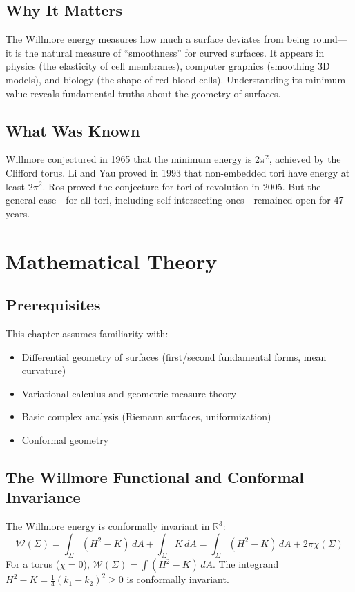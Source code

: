 \subsection{Why It Matters}
The Willmore energy measures how much a surface deviates from being round---it is the natural measure of ``smoothness'' for curved surfaces. It appears in physics (the elasticity of cell membranes), computer graphics (smoothing 3D models), and biology (the shape of red blood cells). Understanding its minimum value reveals fundamental truths about the geometry of surfaces.

\subsection{What Was Known}
Willmore conjectured in 1965 that the minimum energy is $2\pi^2$, achieved by the Clifford torus. Li and Yau proved in 1993 that non-embedded tori have energy at least $2\pi^2$. Ros proved the conjecture for tori of revolution in 2005. But the general case---for all tori, including self-intersecting ones---remained open for 47 years.

\section{Mathematical Theory}


\subsection{Prerequisites}
This chapter assumes familiarity with:
\begin{itemize}
\item Differential geometry of surfaces (first/second fundamental forms, mean curvature)
\item Variational calculus and geometric measure theory
\item Basic complex analysis (Riemann surfaces, uniformization)
\item Conformal geometry
\end{itemize}

\subsection{The Willmore Functional and Conformal Invariance}
The Willmore energy is conformally invariant in $\mathbb{R}^3$:
\[
\mathcal{W}(\Sigma) = \int_\Sigma (H^2 - K) \, dA + \int_\Sigma K \, dA = \int_\Sigma (H^2 - K) \, dA + 2\pi\chi(\Sigma)
\]
For a torus ($\chi=0$), $\mathcal{W}(\Sigma) = \int (H^2 - K) \, dA$. The integrand $H^2 - K = \frac{1}{4}(k_1 - k_2)^2 \ge 0$ is conformally invariant.

